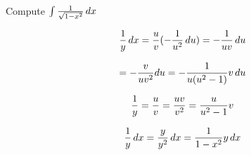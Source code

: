 \vfill\eject

\example Compute $\int {1\over{\sqrt{1-x^2}}} \,dx$

%
%

 $${1\over y}\,dx ={u\over v} (-{1\over{u^2}} \, du) = -{1\over{uv}} \, du$$


 $$= -{v\over{uv^2}} du = -{1\over{u(u^2-1)}}v \, du $$


 $${1\over y} = {u\over v} = {{uv}\over{v^2}}
 = {u\over{u^2-1}} v$$




 $${1\over y}\,dx = {y\over y^2}\,dx = {1\over{1-x^2}}y \,dx $$



